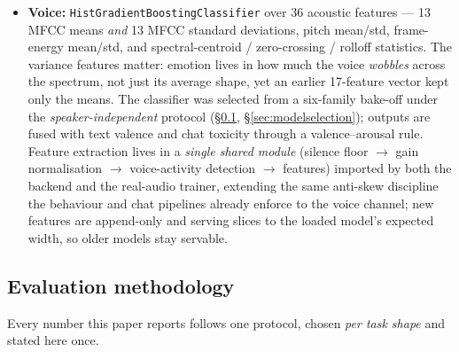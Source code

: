 \documentclass[11pt,a4paper]{article}
\begin{document}
\begin{itemize}[leftmargin=1.4em]
        code-mixed, and while the English-corpus TF-IDF model cannot see these, the
        keyword channel can; collision-prone abbreviations (e.g.\ ``mc'' = Minecraft,
        ``bc'' = because) are deliberately excluded, keeping the list precision-first.
  \item \textbf{Voice:} \texttt{HistGradientBoostingClassifier} over 36 acoustic
        features --- 13 MFCC means \emph{and} 13 MFCC standard deviations, pitch
        mean/std, frame-energy mean/std, and spectral-centroid / zero-crossing /
        rolloff statistics. The variance features
        matter: emotion lives in how much the voice \emph{wobbles} across the
        spectrum, not just its average shape, yet an earlier 17-feature vector kept
        only the means. The classifier was selected from a six-family bake-off under
        the \emph{speaker-independent} protocol (\S\ref{sec:evalmethod},
        \S\ref{sec:modelselection}); outputs are fused
        with text valence and chat toxicity through a valence--arousal rule. Feature extraction
        lives in a \emph{single shared module} (silence floor $\rightarrow$
        gain normalisation $\rightarrow$ voice-activity detection $\rightarrow$
        features) imported by both the backend and the real-audio trainer, extending
        the same anti-skew discipline the behaviour and chat pipelines already
        enforce to the voice channel; new features are append-only and serving slices
        to the loaded model's expected width, so older models stay servable.
\end{itemize}

\subsection{Evaluation methodology}
\label{sec:evalmethod}
Every number this paper reports follows one protocol, chosen \emph{per task shape}
and stated here once.
\end{document}
